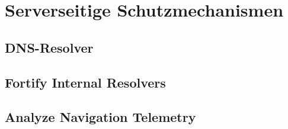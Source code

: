 








\section{Serverseitige Schutzmechanismen}

\subsection{DNS-Resolver}


\subsection{Fortify Internal Resolvers}

\subsection{Analyze Navigation Telemetry}
